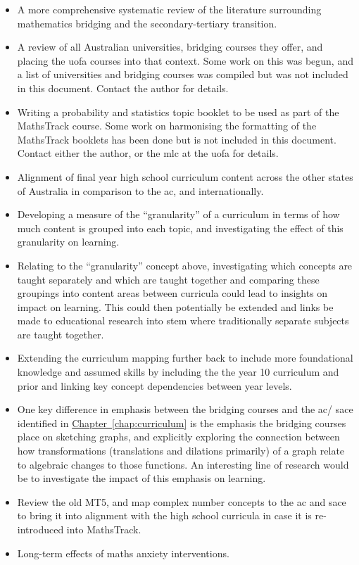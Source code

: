 \documentclass[twoside,12pt,a4paper]{report}
\newcommand{\refchap}[1]{\hyperref[chap:#1]{Chapter~\ref{chap:#1}}}
\begin{document}
\begin{itemize}
	\item A more comprehensive systematic review of the literature surrounding mathematics bridging and the secondary-tertiary transition.
	\item A review of all Australian universities, bridging courses they offer, and placing the \gls{uofa} courses into that context. Some work on this was begun, and a list of universities and bridging courses was compiled but was not included in this document. Contact the author for details.
	\item Writing a probability and statistics topic booklet to be used as part of the MathsTrack course. Some work on harmonising the formatting of the MathsTrack booklets has been done but is not included in this document. Contact either the author, or the \gls{mlc} at the \gls{uofa} for details.
	\item Alignment of final year high school curriculum content across the other states of Australia in comparison to the \gls{ac}, and internationally.
	\item Developing a measure of the ``granularity'' of a curriculum in terms of how much content is grouped into each topic, and investigating the effect of this granularity on learning.
	\item Relating to the ``granularity'' concept above, investigating which concepts are taught separately and which are taught together and comparing these groupings into content areas between curricula could lead to insights on impact on learning. This could then potentially be extended and links be made to educational research into \gls{stem} where traditionally separate subjects are taught together.
	\item Extending the curriculum mapping further back to include more foundational knowledge and assumed skills by including the the year 10 curriculum and prior and linking key concept dependencies between year levels.
	\item One key difference in emphasis between the bridging courses and the \gls{ac}/ \gls{sace} identified in \refchap{curriculum} is the emphasis the bridging courses place on sketching graphs, and explicitly exploring the connection between how transformations (translations and dilations primarily) of a graph relate to algebraic changes to those functions. An interesting line of research would be to investigate the impact of this emphasis on learning.
	\item Review the old MT5, and map complex number concepts to the \gls{ac} and \gls{sace} to bring it into alignment with the high school curricula in case it is re-introduced into MathsTrack.
	\item Long-term effects of maths anxiety interventions.
\end{itemize}
\end{document}
